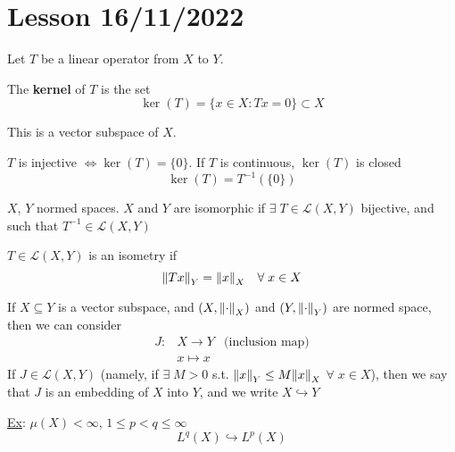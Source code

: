 \section{Lesson 16/11/2022}
Let \(T\) be a linear operator from \(X\) to \(Y\).
\begin{definition}
    The \textbf{kernel} of \(T\) is the set 
    \[
        \ker(T) = \{ x \in X: Tx =0\} \subset X
    \]

\end{definition}

This is a vector subspace of \(X\). 

\(T\) is injective \(\Leftrightarrow \ker (T) = \{0\}\). If \(T\) is continuous, \(\ker(T)\) is closed 
\[
    \ker(T) = T^{-1} (\{0\})
\]
\begin{definition}
    \(X\), \(Y\) normed spaces. \(X\) and \(Y\) are isomorphic if \(\exists \; T \in \mathcal{L}(X, Y)\) bijective, and such that \(T^{-1} \in \mathcal{L}(X, Y)\)
\end{definition}
\begin{definition}
    \(T \in \mathcal{L}(X, Y)\) is an isometry if
    \[
        \norm{Tx}_Y = \norm{x}_X \quad \forall \; x \in X
    \]
\end{definition}
\begin{definition}
    If \(X \subseteq Y\) is a vector subspace, and \(\left(X, \norm{\cdot}_X\right)\) and \(\left(Y, \norm{\cdot}_Y\right)\) are normed space, then we can consider 
    \[
        \begin{array}{rcr}
            J: & X \to Y & \text{(inclusion map)}
            \\ & x \mapsto x
        \end{array}
    \] 
    If \(J \in \mathcal{L}(X, Y)\) (namely, if \(\exists \; M>0 \) s.t. \(\norm{x}_Y \leq M \norm{x}_X\) \(\forall \; x \in X\)), 
    then we say that \(J\) is an embedding of \(X\) into \(Y\), and we write \(X \hookrightarrow Y\)
\end{definition}

\underline{Ex}: \(\mu(X) < \infty \), \(1 \leq p < q \leq \infty\)
\[
    L^q(X) \hookrightarrow L^p(X) \tag*{(inclusion of \(L^p\) spaces)}
\]

